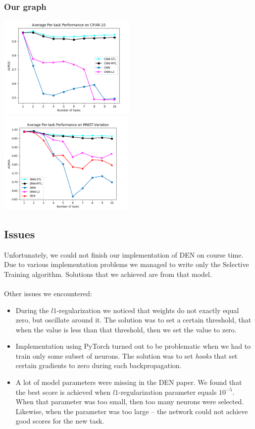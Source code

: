 \documentclass[12pt]{article}
\begin{document}
    \subsubsection{Our graph}
    \includegraphics[height=5cm]{fig1-s.png}
    \includegraphics[height=5cm]{fig2-v2.png}

    \subsection{Issues}

    Unfortunately, we could not finish our implementation of DEN on course time. Due to various implementation
    problems we managed to write only the Selective Training algorithm. Solutions that we achieved are
    from that model.
    \\
    \\
    Other issues we encountered:

    \begin{itemize}
        \item During the $l1$-regularization we noticed that weights do not exactly equal zero, but
        oscillate around it. The solution was to set a certain threshold, that when the value is less than
        that threshold, then we set the value to zero.
        \item Implementation using PyTorch turned out to be problematic when we had to train only
        some subset of neurons. The solution was to set \textit{hooks} that set certain gradients to zero
        during each backpropagation.
        \item A lot of model parameters were missing in the DEN paper. We found that the best score is
        achieved when $l1$-regularization parameter equals $10^{-5}$. When that parameter was too small,
        then too many neurons were selected. Likewise, when the parameter was too large -- the network
        could not achieve good scores for the new task.
    \end{itemize}
\end{document}
